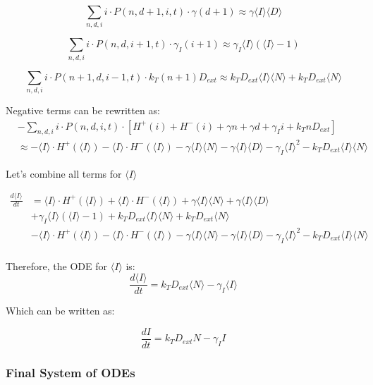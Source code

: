 \documentclass{article}
\begin{document}
\begin{flushleft}
\[
\sum_{n,d,i} i \cdot P(n,d+1,i,t) \cdot \gamma(d+1) \approx \gamma \langle I \rangle \langle D \rangle
\]

\[
\sum_{n,d,i} i \cdot P(n,d,i+1,t) \cdot \gamma_I(i+1) \approx \gamma_I \langle I \rangle (\langle I \rangle - 1)
\]

\[
\sum_{n,d,i} i \cdot P(n+1,d,i-1,t) \cdot k_T(n+1)D_{ext} \approx k_T D_{ext} \langle I \rangle \langle N \rangle + k_T D_{ext} \langle N \rangle
\]

Negative terms can be rewritten as:
\begin{align*}
&-\sum_{n,d,i} i \cdot P(n,d,i,t) \cdot [H^+(i) + H^-(i) + \gamma n + \gamma d + \gamma_I i + k_T n D_{ext}] \\
&\approx -\langle I \rangle \cdot H^+(\langle I \rangle) - \langle I \rangle \cdot H^-(\langle I \rangle) - \gamma \langle I \rangle \langle N \rangle - \gamma \langle I \rangle \langle D \rangle - \gamma_I \langle I \rangle^2 - k_T D_{ext} \langle I \rangle \langle N \rangle
\end{align*}

Let's combine all terms for $\langle I \rangle$

\begin{align*}
\frac{d\langle I \rangle}{dt} &= \langle I \rangle \cdot H^+(\langle I \rangle) + \langle I \rangle \cdot H^-(\langle I \rangle) + \gamma \langle I \rangle \langle N \rangle + \gamma \langle I \rangle \langle D \rangle \\
&+ \gamma_I \langle I \rangle (\langle I \rangle - 1) + k_T D_{ext} \langle I \rangle \langle N \rangle + k_T D_{ext} \langle N \rangle \\
&- \langle I \rangle \cdot H^+(\langle I \rangle) - \langle I \rangle \cdot H^-(\langle I \rangle) - \gamma \langle I \rangle \langle N \rangle - \gamma \langle I \rangle \langle D \rangle - \gamma_I \langle I \rangle^2 - k_T D_{ext} \langle I \rangle \langle N \rangle \\
\end{align*}

Therefore, the ODE for $\langle I \rangle$ is:
\[
\frac{d\langle I \rangle}{dt} = k_T D_{ext} \langle N \rangle - \gamma_I \langle I \rangle
\]

Which can be written as:

\[
\frac{dI}{dt} = k_T D_{ext} N - \gamma_I I
\]

\subsubsection{Final System of ODEs}


\end{flushleft}
\end{document}
